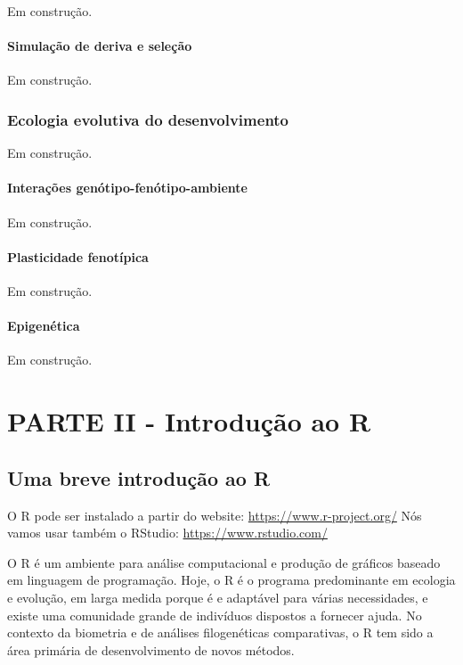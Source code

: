 \documentclass[
]{book}
\begin{document}
Em construção.

\subsection{Simulação de deriva e seleção}\label{simulauxe7uxe3o-de-deriva-e-seleuxe7uxe3o}

Em construção.

\section{Ecologia evolutiva do desenvolvimento}\label{ecologia-evolutiva-do-desenvolvimento}

Em construção.

\subsection{Interações genótipo-fenótipo-ambiente}\label{interauxe7uxf5es-genuxf3tipo-fenuxf3tipo-ambiente}

Em construção.

\subsection{Plasticidade fenotípica}\label{plasticidade-fenotuxedpica}

Em construção.

\subsection{Epigenética}\label{epigenuxe9tica}

Em construção.

\part{PARTE II - Introdução ao R}\label{part-parte-ii---introduuxe7uxe3o-ao-r}

\chapter{Uma breve introdução ao R}\label{cap2}

O R pode ser instalado a partir do website: \url{https://www.r-project.org/} Nós vamos usar também o RStudio: \url{https://www.rstudio.com/}

O R é um ambiente para análise computacional e produção de gráficos baseado em linguagem de programação.
Hoje, o R é o programa predominante em ecologia e evolução, em larga medida porque é e adaptável para várias necessidades, e existe uma comunidade grande de indivíduos dispostos a fornecer ajuda.
No contexto da biometria e de análises filogenéticas comparativas, o R tem sido a área primária de desenvolvimento de novos métodos.
\end{document}
